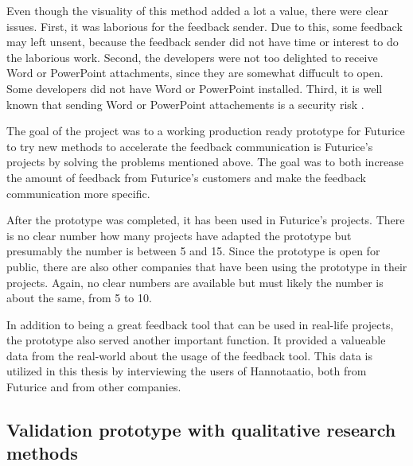 \documentclass[english,12pt,a4paper,pdftex]{article}
\begin{document}
Even though the visuality of this method added a lot a value, there were clear issues. First, it was laborious for the feedback sender. Due to this, some feedback may left unsent, because the feedback sender did not have time or interest to do the laborious work. Second, the developers were not too delighted to receive Word or PowerPoint attachments, since they are somewhat diffucult to open. Some developers did not have Word or PowerPoint installed. Third, it is well known that sending Word or PowerPoint attachements is a security risk \citep{tyson2011}.

The goal of the project was to a working production ready prototype for Futurice to try new methods to accelerate the feedback communication is Futurice's projects by solving the problems mentioned above. The goal was to both increase the amount of feedback from Futurice's customers and make the feedback communication more specific.

After the prototype was completed, it has been used in Futurice's projects. There is no clear number how many projects have adapted the prototype but presumably the number is between 5 and 15. Since the prototype is open for public, there are also other companies that have been using the prototype in their projects. Again, no clear numbers are available but must likely the number is about the same, from 5 to 10.

In addition to being a great feedback tool that can be used in real-life projects, the prototype also served another important function. It provided a valueable data from the real-world about the usage of the feedback tool. This data is utilized in this thesis by interviewing the users of Hannotaatio, both from Futurice and from other companies.

\subsection{Validation prototype with qualitative research methods}
\end{document}
